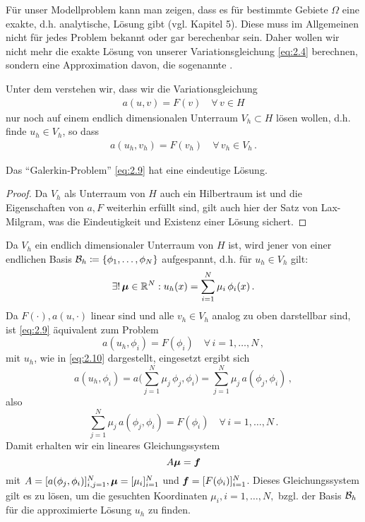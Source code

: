 Für unser Modellproblem kann man zeigen, dass es für bestimmte Gebiete $\Omega$ eine exakte, d.h. analytische, Lösung gibt (vgl. \cite{Walker} Kapitel 5). Diese muss im Allgemeinen nicht für jedes Problem bekannt oder gar berechenbar sein. Daher wollen wir nicht mehr die exakte Lösung von unserer Variationsgleichung \eqref{eq:2.4} berechnen, sondern eine Approximation davon, die sogenannte \textit{}.

Unter dem \textit{} verstehen wir, dass wir die Variationsgleichung
\begin{align}\label{eq:2.8}
	a(u,v) = F(v) \quad \forall \, v \in H
\end{align}
nur noch auf einem endlich dimensionalen Unterraum $V_h \subset H$ lösen wollen, d.h. finde $u_h \in V_h$, so dass
\begin{align}\label{eq:2.9}
	a(u_h,v_h) = F(v_h) \quad \forall \, v_h \in V_h \, .
\end{align}


\begin{satz}\label{satz:2.17}
Das "`Galerkin-Problem"' \eqref{eq:2.9} hat eine eindeutige Lösung.
\end{satz}

\begin{proof}
Da $V_h$ als Unterraum von $H$ auch ein Hilbertraum ist und die Eigenschaften von $a, F$ weiterhin erfüllt sind, gilt auch hier der Satz von Lax-Milgram, was die Eindeutigkeit und Existenz einer Lösung sichert.
\end{proof}


Da $V_h$ ein endlich dimensionaler Unterraum von $H$ ist, wird jener von einer endlichen Basis $\mathcal B_h \coloneqq \{\phi_1,\ldots,\phi_N\}$ aufgespannt, d.h. für $u_h \in V_h$ gilt:
\begin{align}\label{eq:2.10}
	\exists! \, \boldsymbol\mu \in \mathbb{R}^N :  u_h(x) = \sum_{i = 1}^N \mu_i \,  \phi_i(x) \, .
\end{align}
Da $F(\cdot),a(u,\cdot)$ linear sind und alle $v_h \in V_h$ analog zu oben darstellbar sind, ist \eqref{eq:2.9} äquivalent zum Problem
\[
	a(u_h,\phi_i) = F(\phi_i) \quad \forall \, i = 1, \ldots,N \, ,
\]
mit $u_h$, wie in \eqref{eq:2.10} dargestellt, eingesetzt ergibt sich
\[
	a(u_h,\phi_i) = a \Big( \sum_{j = 1}^N \mu_j \,  \phi_j,\phi_i \Big) = \sum_{j = 1}^N \mu_j \, a(\phi_j,\phi_i) \, ,
\]
also
\[
	 \sum_{j = 1}^N \mu_j \, a(\phi_j,\phi_i) = F(\phi_i)\quad \forall \, i = 1, \ldots,N \, .
\]
Damit erhalten wir ein lineares Gleichungssystem
\[
	A \boldsymbol \mu = \boldsymbol f 
\]
mit $A = [a(\phi_j,\phi_i)]_{i,j=1}^N, \boldsymbol \mu = [\mu_i]_{i=1}^N$ und $\boldsymbol f = [F(\phi_i)]_{i=1}^N$. Dieses Gleichungssystem gilt es zu lösen, um die gesuchten Koordinaten $\mu_i, i = 1,\ldots,N,$ bzgl. der Basis $\mathcal B_h$ für die approximierte Lösung $u_h$ zu finden.

